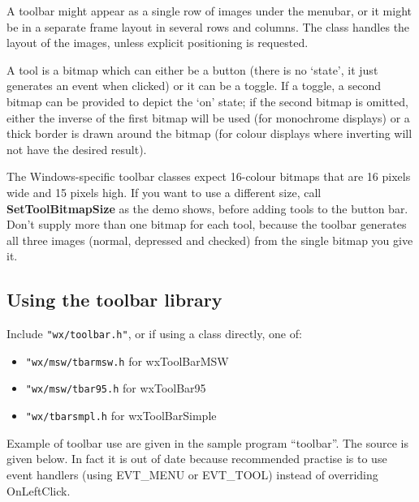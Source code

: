 A toolbar might appear as a single row of images under
the menubar, or it might be in a separate frame layout in several rows
and columns. The class handles the layout of the images, unless explicit
positioning is requested.

A tool is a bitmap which can either be a button (there is no `state',
it just generates an event when clicked) or it can be a toggle. If a
toggle, a second bitmap can be provided to depict the `on' state; if
the second bitmap is omitted, either the inverse of the first bitmap
will be used (for monochrome displays) or a thick border is drawn
around the bitmap (for colour displays where inverting will not have
the desired result).

The Windows-specific toolbar classes expect 16-colour bitmaps that are 16 pixels wide and 15 pixels
high. If you want to use a different size, call {\bf SetToolBitmapSize}\rtfsp
as the demo shows, before adding tools to the button bar. Don't supply more than
one bitmap for each tool, because the toolbar generates all three images (normal,
depressed and checked) from the single bitmap you give it.

\subsection{Using the toolbar library}

Include {\tt "wx/toolbar.h"}, or if using a class directly, one of:

\begin{itemize}\itemsep=0pt
\item {\tt "wx/msw/tbarmsw.h} for wxToolBarMSW
\item {\tt "wx/msw/tbar95.h} for wxToolBar95
\item {\tt "wx/tbarsmpl.h} for wxToolBarSimple
\end{itemize}

Example of toolbar use are given in the sample program ``toolbar''. The
source is given below. In fact it is out of date because recommended
practise is to use event handlers (using EVT\_MENU or EVT\_TOOL) instead of
overriding OnLeftClick.

